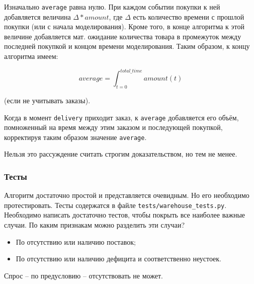\documentclass[12pt,final]{article}
\begin{document}
Изначально \texttt{average} равна нулю. При каждом событии покупки к ней добавляется величина $\Delta * amount$, где $\Delta$ есть количество времени с прошлой покупки (или с начала моделирования). Кроме того, в конце алгоритма к этой величине добавляется мат. ожидание количества товара в промежуток между последней покупкой и концом времени моделирования. Таким образом, к концу алгоритма имеем:

\begin{equation*}
    average = \int_{t=0}^{total\_time} amount(t)
\end{equation*}

(если не учитывать заказы).

Когда в момент \texttt{delivery} приходит заказ, к \texttt{average} добавляется его объём, помноженный на время между этим заказом и последующей покупкой, корректируя таким образом значение \texttt{average}.

Нельзя это рассуждение считать строгим доказательством, но тем не менее.

\subsubsection{Тесты}

Алгоритм достаточно простой и представляется очевидным. Но его необходимо протестировать. Тесты содержатся в файле \texttt{tests/warehouse\_tests.py}. Необходимо написать достаточно тестов, чтобы покрыть все наиболее важные случаи. По каким признакам можно разделить эти случаи?

\begin{itemize}
    \item По отсутствию или наличию поставок;
    \item По отсутствию или наличию дефицита и соответственно неустоек.
\end{itemize}

Спрос -- по предусловию -- отсутствовать не может.
\end{document}
